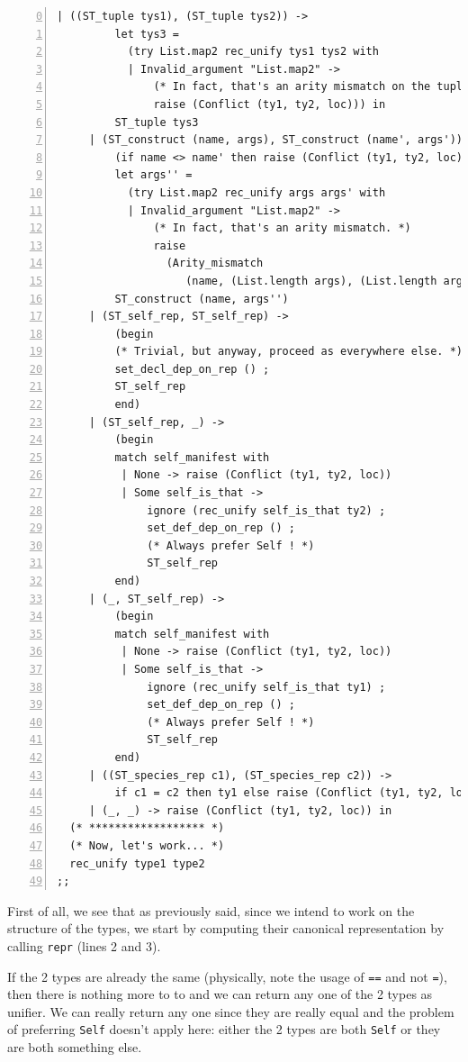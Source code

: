 {\begin{lstlisting}[language=MyOCaml,numbers=left, firstnumber=0,
                   title=The unification algorithm]
     | ((ST_tuple tys1), (ST_tuple tys2)) ->
         let tys3 =
           (try List.map2 rec_unify tys1 tys2 with
           | Invalid_argument "List.map2" ->
               (* In fact, that's an arity mismatch on the tuple. *)
               raise (Conflict (ty1, ty2, loc))) in
         ST_tuple tys3
     | (ST_construct (name, args), ST_construct (name', args')) ->
         (if name <> name' then raise (Conflict (ty1, ty2, loc))) ;
         let args'' =
           (try List.map2 rec_unify args args' with
           | Invalid_argument "List.map2" ->
               (* In fact, that's an arity mismatch. *)
               raise
                 (Arity_mismatch
                    (name, (List.length args), (List.length args'), loc))) in
         ST_construct (name, args'')
     | (ST_self_rep, ST_self_rep) ->
         (begin
         (* Trivial, but anyway, proceed as everywhere else. *)
         set_decl_dep_on_rep () ;
         ST_self_rep
         end)
     | (ST_self_rep, _) ->
         (begin
         match self_manifest with
          | None -> raise (Conflict (ty1, ty2, loc))
          | Some self_is_that ->
              ignore (rec_unify self_is_that ty2) ;
              set_def_dep_on_rep () ;
              (* Always prefer Self ! *)
              ST_self_rep
         end)
     | (_, ST_self_rep) ->
         (begin
         match self_manifest with
          | None -> raise (Conflict (ty1, ty2, loc))
          | Some self_is_that ->
              ignore (rec_unify self_is_that ty1) ;
              set_def_dep_on_rep () ;
              (* Always prefer Self ! *)
              ST_self_rep
         end)
     | ((ST_species_rep c1), (ST_species_rep c2)) ->
         if c1 = c2 then ty1 else raise (Conflict (ty1, ty2, loc))
     | (_, _) -> raise (Conflict (ty1, ty2, loc)) in
  (* ****************** *)
  (* Now, let's work... *)
  rec_unify type1 type2
;;
\end{lstlisting}
}

First of all, we see that as previously said, since we intend to work
on the structure of the types, we start by computing their canonical
representation by calling {\tt repr} (lines 2 and 3).

If the 2 types are already the same (physically, note the usage of
{\tt ==} and not {\tt =}), then there is nothing more to to and we can
return any one of the 2 types as unifier. We can really return any one
since they are really equal and the problem of preferring {\tt Self}
doesn't apply here: either the 2 types are both {\tt Self} or they are
both something else.

